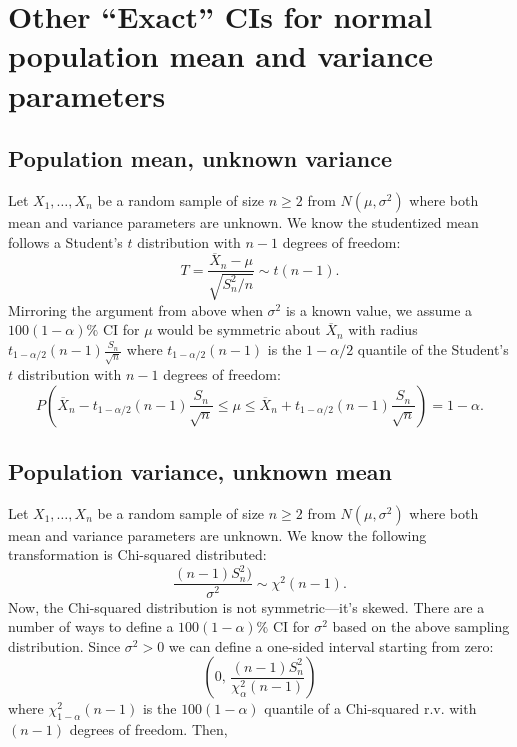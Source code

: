 \documentclass[]{book}
\begin{document}
\section{\texorpdfstring{Other ``Exact'' CIs for normal population mean
and variance
parameters}{Other Exact CIs for normal population mean and variance parameters}}\label{other-exact-cis-for-normal-population-mean-and-variance-parameters}

\subsection{Population mean, unknown
variance}\label{population-mean-unknown-variance}

Let \(X_1, \ldots, X_n\) be a random sample of size \(n\geq 2\) from
\(N(\mu, \sigma^2)\) where both mean and variance parameters are
unknown. We know the studentized mean follows a Student's \(t\)
distribution with \(n-1\) degrees of freedom:
\[T = \frac{\overline X_n - \mu}{\sqrt{S_n^2/n}}\sim t(n-1).\] Mirroring
the argument from above when \(\sigma^2\) is a known value, we assume a
\(100(1-\alpha)\%\) CI for \(\mu\) would be symmetric about
\(\overline X_n\) with radius
\(t_{1-\alpha/2}(n-1) \frac{S_n}{\sqrt{n}}\) where
\(t_{1-\alpha/2}(n-1)\) is the \(1-\alpha/2\) quantile of the Student's
\(t\) distribution with \(n-1\) degrees of freedom:
\[P\left(\overline X_n - t_{1-\alpha/2}(n-1) \frac{S_n}{\sqrt{n}} \leq \mu \leq \overline X_n + t_{1-\alpha/2}(n-1) \frac{S_n}{\sqrt{n}}\right) = 1-\alpha.\]

\subsection{Population variance, unknown
mean}\label{population-variance-unknown-mean}

Let \(X_1, \ldots, X_n\) be a random sample of size \(n\geq 2\) from
\(N(\mu, \sigma^2)\) where both mean and variance parameters are
unknown. We know the following transformation is Chi-squared
distributed: \[\frac{(n-1)S_n^2)}{\sigma^2}\sim \chi^2(n-1).\] Now, the
Chi-squared distribution is not symmetric---it's skewed. There are a
number of ways to define a \(100(1-\alpha)\%\) CI for \(\sigma^2\) based
on the above sampling distribution. Since \(\sigma^2 > 0\) we can define
a one-sided interval starting from zero:
\[\left(0, \, \frac{(n-1)S_n^2}{\chi^2_{\alpha}(n-1)}\right)\] where
\(\chi^2_{1-\alpha}(n-1)\) is the \(100(1-\alpha)\) quantile of a
Chi-squared r.v. with \((n-1)\) degrees of freedom. Then,
\end{document}
